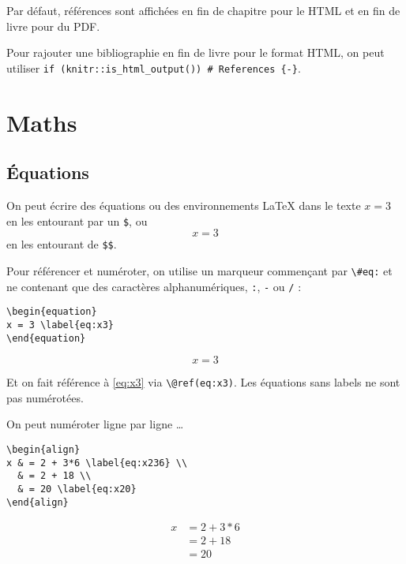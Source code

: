 \documentclass[]{book}
\theoremstyle{definition}
\theoremstyle{definition}
\theoremstyle{definition}
\theoremstyle{remark}
\begin{document}
Par défaut, références sont affichées en fin de chapitre pour le HTML et en fin de livre pour du PDF.

Pour rajouter une bibliographie en fin de livre pour le format HTML, on peut utiliser \texttt{if\ (knitr::is\_html\_output())\ \textquotesingle{}\#\ References\ \{-\}\textquotesingle{}}.

\hypertarget{maths}{%
\chapter{Maths}\label{maths}}

\hypertarget{equations}{%
\section{Équations}\label{equations}}

On peut écrire des équations ou des environnements LaTeX dans le texte \(x = 3\) en les entourant par un \texttt{\$}, ou \[x = 3\] en les entourant de \texttt{\$\$}.

Pour référencer et numéroter, on utilise un marqueur commençant par \texttt{\textbackslash{}\#eq:} et ne contenant que des caractères alphanumériques, \texttt{:}, \texttt{-} ou \texttt{/} :

\begin{verbatim}
\begin{equation}
x = 3 \label{eq:x3}
\end{equation}
\end{verbatim}

\begin{equation}
x = 3 \label{eq:x3}
\end{equation}

Et on fait référence à \eqref{eq:x3} via \texttt{\textbackslash{}@ref(eq:x3)}. Les équations sans labels ne sont pas numérotées.

On peut numéroter ligne par ligne \ldots{}

\begin{verbatim}
\begin{align}
x & = 2 + 3*6 \label{eq:x236} \\
  & = 2 + 18 \\
  & = 20 \label{eq:x20}
\end{align}
\end{verbatim}

\begin{align}
x & = 2 + 3*6 \label{eq:x236} \\
  & = 2 + 18 \\
  & = 20 \label{eq:x20}
\end{align}
\end{document}

